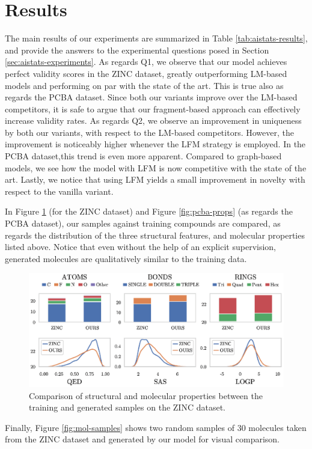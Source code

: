 \section{Results}
The main results of our experiments are summarized in Table \ref{tab:aistats-results}, and provide the answers to the experimental questions posed in Section \ref{sec:aistats-experiments}. As regards Q1, we observe that our model achieves perfect validity scores in the ZINC dataset, greatly outperforming LM-based models and performing on par with the state of the art. This is true also as regards the PCBA dataset. Since both our variants improve over the LM-based competitors, it is safe to argue that our fragment-based approach can effectively increase validity rates. As regards Q2, we observe an improvement in uniqueness by both our variants, with respect to the LM-based competitors. However, the improvement is noticeably higher whenever the LFM strategy is employed. In the PCBA dataset,this trend is even more apparent. Compared to graph-based models, we see how the model with LFM is now competitive with the state of the art. Lastly, we notice that using LFM yields a small improvement in novelty with respect to the vanilla variant.

In Figure \ref{fig:zinc-props} (for the ZINC dataset) and Figure \ref{fig:pcba-props} (as regards the PCBA dataset), our samples against training compounds are compared, as regards the distribution of the three structural features, and molecular properties listed above. Notice that even without the help of an explicit supervision, generated molecules are qualitatively similar to the training data.
\begin{figure}[h!]
    \centering
    \includegraphics[width=.95\textwidth]{Figures/Chapter7/props-zinc.eps}
    \caption{Comparison of structural and molecular properties between the training and generated samples on the ZINC dataset.}
    \label{fig:zinc-props}
\end{figure}
Finally, Figure \ref{fig:mol-samples} shows two random samples of 30 molecules taken from the ZINC dataset and generated by our model for visual comparison.
